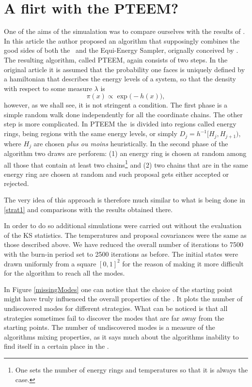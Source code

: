 \section{A flirt with the PTEEM?}

One of the aims of the simualation was to compare ourselves with the results of \cite{BaragattiLikelihoodFreeParallelTempering}. In this article the author proposed an algorithm that supposingly combines the good sides of both the \PT\, and the Equi-Energy Sampler, orignally conceived by \cite{ Kuo2006}. The resulting algorithm, called PTEEM, again consists of two steps. In the original article it is assumed that the probability one faces is uniquely defined by a hamiltonian that describes the energy levels of a system, so that the density with respect to some measure $\lambda$ is
$$
	\pi(x) \propto \exp\Big(-h(x)\Big),
$$
however, as we shall see, it is not stringent a condition. The first phase is a simple random walk done independently for all the coordinate chains. The other step is more complicated. In PTEEM the \sspace\,is divided into regions called energy rings, being regions with the same energy levels, or simply $D_j = h^{-1}[H_j, H_{j+1})$, where $H_j$ are chosen {\it plus ou moins} heuristically. In the second phase of the algorithm two draws are perforem: (1) an energy ring is chosen at random among all those that contain at least two chains\footnote{One sets the number of energy rings and temperatures so that it is always the case.} and (2) two chains that are in the same energy ring are chosen at random and such proposal gets either accepted or rejected. 

The very idea of this approach is therefore much similar to what is being done in \ref{strat1} and comparisons with the results obtained there.      

In order to do so additional simulations were carried out without the evaluation of the \textsc{KS} statistics. The temperatures and proposal covariances were the same as those described above. We have reduced the overall number of iterations to 7500 with the burn-in period set to 2500 iterations as before. The initial states were drawn uniformly from a square $[0,1]^2$ for the reason of making it more difficult for the algorithm to reach all the modes.  

In Figure \ref{missingModes} one can notice that the choice of the starting point might have truly influenced the overall properties of the \PT. It plots the number of undiscovered modes for different strategies. What can be noticed is that all strategies sometimes fail to discover the modes that are far away from the starting points. The number of undiscovered modes is a measure of the algorithms mixing properties, as it says much about the algorithms inability to find itself in a certain place in the \sspace. 

